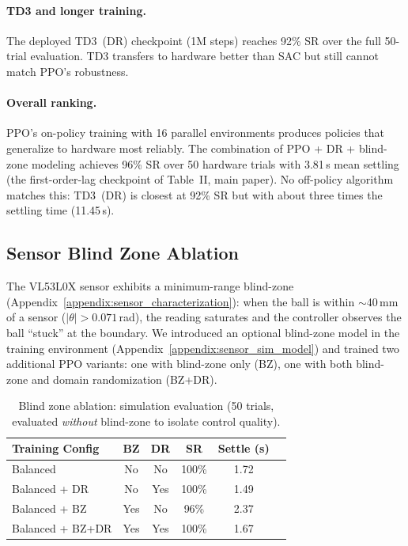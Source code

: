\paragraph{TD3 and longer training.}
The deployed TD3~(DR) checkpoint (1M steps) reaches 92\% SR over the
full 50-trial evaluation. TD3 transfers to hardware better than SAC
but still cannot match PPO's robustness.

\paragraph{Overall ranking.}
PPO's on-policy training with 16 parallel environments produces
policies that generalize to hardware most reliably.
The combination of PPO + DR + blind-zone modeling achieves
96\% SR over 50 hardware trials with 3.81\,s mean settling (the
first-order-lag checkpoint of Table~II, main paper).
No off-policy algorithm matches this: TD3~(DR) is closest
at 92\% SR but with about three times the settling time (11.45\,s).

\subsection{Sensor Blind Zone Ablation}
\label{appendix:blind_zone}

The VL53L0X sensor exhibits a minimum-range blind-zone
(Appendix~\ref{appendix:sensor_characterization}): when the ball
is within $\sim$40\,mm of a sensor ($|\theta| > 0.071$\,rad),
the reading saturates and the controller observes the ball
``stuck'' at the boundary.
We introduced an optional blind-zone model in the training
environment (Appendix~\ref{appendix:sensor_sim_model}) and trained two
additional PPO variants: one with blind-zone only (BZ), one with
both blind-zone and domain randomization (BZ+DR).

\begin{table}[!t]
\centering
\renewcommand{\arraystretch}{1.15}
\caption{Blind zone ablation: simulation evaluation
         (50 trials, evaluated \emph{without} blind-zone to isolate
         control quality).}
\label{tab:blind_zone_sim}
\begin{tabular}{lccccc}
\toprule
\textbf{Training Config} & \textbf{BZ} & \textbf{DR}
  & \textbf{SR} & \textbf{Settle (s)} \\
\midrule
Balanced          & No    & No    & 100\% & 1.72 \\
Balanced + DR     & No    & Yes & 100\% & 1.49 \\
Balanced + BZ     & Yes & No    &  96\% & 2.37 \\
Balanced + BZ+DR  & Yes & Yes & 100\% & 1.67 \\
\bottomrule
\end{tabular}
\end{table}

